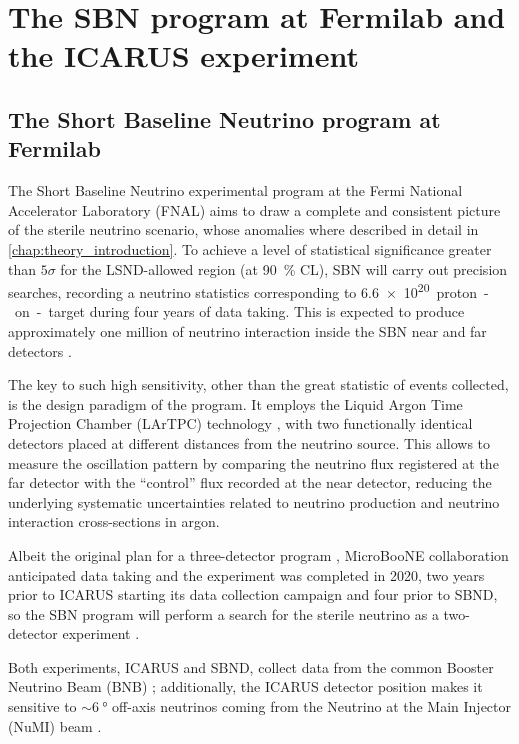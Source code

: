 
\chapter{The SBN program at Fermilab and the ICARUS experiment}
\label{chap:icarus_detector}

\section{The Short Baseline Neutrino program at Fermilab}
The Short Baseline Neutrino experimental program at the Fermi National Accelerator Laboratory (FNAL) aims to  draw a complete and consistent picture of the sterile neutrino scenario, whose anomalies where described in detail in \autoref{chap:theory_introduction}. 
To achieve a level of statistical significance greater than $5\sigma$ for the LSND-allowed region (at \SI{90}{\percent} CL), SBN will carry out precision searches, recording a neutrino statistics corresponding to \SI{6.6e20}{proton-on-target} during four years of data taking. This is expected to produce approximately one million of neutrino interaction inside the SBN near and far detectors \cite{acciarriProposalThreeDetector2015}. 

The key to such high sensitivity, other than the great statistic of events collected, is the design paradigm of the program. It employs the Liquid Argon Time Projection Chamber (LArTPC) technology \cite{rubbiaLiquidArgonTime1977}, with two functionally identical detectors placed at different distances from the neutrino source. This allows to measure the oscillation pattern by comparing the neutrino flux registered at the far detector with the ``control'' flux recorded at the near detector, reducing the underlying systematic uncertainties related to neutrino production and neutrino interaction cross-sections in argon. 

Albeit the original plan for a three-detector program \cite{acciarriProposalThreeDetector2015}, MicroBooNE collaboration anticipated data taking and the experiment was completed in 2020, two years prior to ICARUS starting its data collection campaign and four prior to SBND, so the SBN program will perform a search for the sterile neutrino as a two-detector experiment \cite{acciarriProposalThreeDetector2015, machadoShortBaselineNeutrinoProgram2019}. 

Both experiments, ICARUS and SBND, collect data from the common Booster Neutrino Beam (BNB) \cite{Stancu:2001cpa}; additionally, the ICARUS detector position makes it sensitive to ${\sim}\SI{6}{\degree}$ off-axis neutrinos coming from the Neutrino at the Main Injector (NuMI) beam \cite{Adamson:2015dkw}. 

